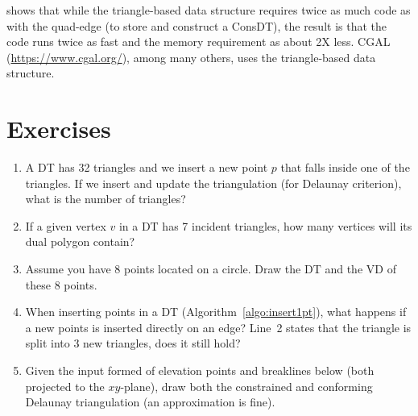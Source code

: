 
\citet{Shewchuk97} shows that while the triangle-based data structure requires twice as much code as with the quad-edge (to store and construct a ConsDT), the result is that the code runs twice as fast and the memory requirement as about 2X less.
CGAL (\url{https://www.cgal.org/}), among many others, uses the triangle-based data structure.


%
\section{Exercises}

\begin{enumerate}
  \item A DT has 32 triangles and we insert a new point $p$ that falls inside one of the triangles. If we insert and update the triangulation (for Delaunay criterion), what is the number of triangles?
  \item If a given vertex $v$ in a DT has 7 incident triangles, how many vertices will its dual polygon contain?
  \item Assume you have 8 points located on a circle. Draw the DT and the VD of these 8 points.
  \item When inserting points in a DT (Algorithm~\ref{algo:insert1pt}), what happens if a new points is inserted directly on an edge? Line~2 states that the triangle is split into 3 new triangles, does it still hold?
  \item Given the input formed of elevation points and breaklines below (both projected to the $xy$-plane), draw both the constrained and conforming Delaunay triangulation (an approximation is fine).
  \\ \\

\end{enumerate}

